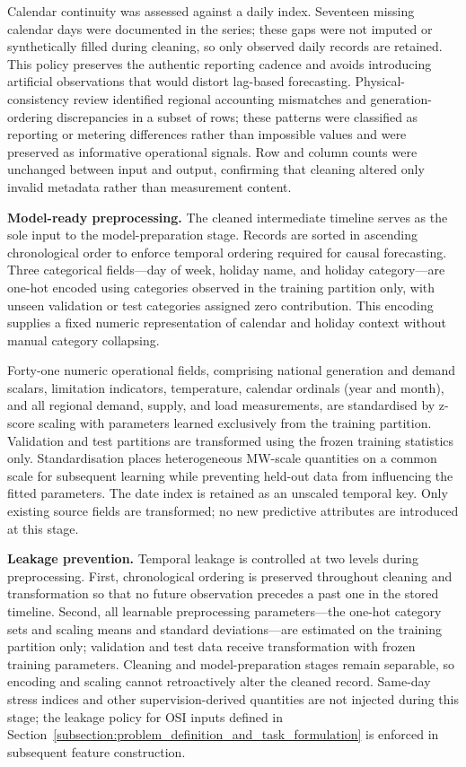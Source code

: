 Calendar continuity was assessed against a daily index. Seventeen missing calendar days were documented in the series; these gaps were not imputed or synthetically filled during cleaning, so only observed daily records are retained. This policy preserves the authentic reporting cadence and avoids introducing artificial observations that would distort lag-based forecasting. Physical-consistency review identified regional accounting mismatches and generation-ordering discrepancies in a subset of rows; these patterns were classified as reporting or metering differences rather than impossible values and were preserved as informative operational signals. Row and column counts were unchanged between input and output, confirming that cleaning altered only invalid metadata rather than measurement content.

\textbf{Model-ready preprocessing.} The cleaned intermediate timeline serves as the sole input to the model-preparation stage. Records are sorted in ascending chronological order to enforce temporal ordering required for causal forecasting. Three categorical fields---day of week, holiday name, and holiday category---are one-hot encoded using categories observed in the training partition only, with unseen validation or test categories assigned zero contribution. This encoding supplies a fixed numeric representation of calendar and holiday context without manual category collapsing.

Forty-one numeric operational fields, comprising national generation and demand scalars, limitation indicators, temperature, calendar ordinals (year and month), and all regional demand, supply, and load measurements, are standardised by z-score scaling with parameters learned exclusively from the training partition. Validation and test partitions are transformed using the frozen training statistics only. Standardisation places heterogeneous MW-scale quantities on a common scale for subsequent learning while preventing held-out data from influencing the fitted parameters. The date index is retained as an unscaled temporal key. Only existing source fields are transformed; no new predictive attributes are introduced at this stage.

\textbf{Leakage prevention.} Temporal leakage is controlled at two levels during preprocessing. First, chronological ordering is preserved throughout cleaning and transformation so that no future observation precedes a past one in the stored timeline. Second, all learnable preprocessing parameters---the one-hot category sets and scaling means and standard deviations---are estimated on the training partition only; validation and test data receive transformation with frozen training parameters. Cleaning and model-preparation stages remain separable, so encoding and scaling cannot retroactively alter the cleaned record. Same-day stress indices and other supervision-derived quantities are not injected during this stage; the leakage policy for OSI inputs defined in Section~\ref{subsection:problem_definition_and_task_formulation} is enforced in subsequent feature construction.


